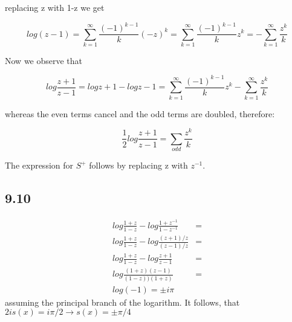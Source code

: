 \documentclass[]{article}
\begin{document}
replacing z with 1-z we get 

$$
log(z-1) = \sum_{k=1}^{\infty} \frac{(-1)^{k-1}}{k}(-z)^k = 
\sum_{k=1}^{\infty} \frac{(-1)^{k-1}}{k}z^k 
= - \sum_{k=1}^{\infty} \frac{z^k}{k}
$$

Now we observe that 

$$
log\frac{z+1}{z-1} = log{z+1}-log{z-1} =  
\sum_{k=1}^{\infty} \frac{(-1)^{k-1}}{k}z^k - \sum_{k=1}^{\infty} \frac{z^k}{k}
$$

whereas the even terms cancel and the odd terms are doubled, therefore:

$$
\frac{1}{2}log\frac{z+1}{z-1} = \sum_{odd} \frac{z^k}{k}
$$

The expression for $S^+$ follows by replacing z with $z^{-1}$.

\subsection*{9.10}

\begin{eqnarray}
log\frac{1+z}{1-z} - log\frac{1+z^{-1}}{1-z^{-1}} &= \\
log\frac{1+z}{1-z} - log\frac{(z+1)/z}{(z-1)/z} &= \\
log\frac{1+z}{1-z} - log\frac{z+1}{z-1} &= \\
log\frac{(1+z)(z-1)}{(1-z))(1+z)} &= \\
log(-1) = \pm i\pi
\end{eqnarray}
assuming the principal branch of the logarithm.
It follows, that $2is(x) = i\pi/2 \rightarrow s(x) = \pm \pi/4$
\end{document}
